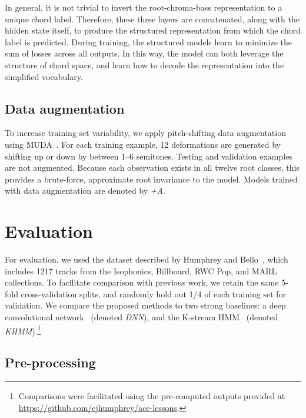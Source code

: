 \documentclass{article}
\begin{document}
In general, it is not trivial to invert the root-chroma-bass representation to a unique chord label.
Therefore, these three layers are concatenated, along with the hidden state itself, to produce the structured representation from which the chord label is predicted.
During training, the structured models learn to minimize the sum of losses across all outputs.
In this way, the model can both leverage the structure of chord space, and learn how to decode the representation into the simplified vocabulary.

\subsection{Data augmentation}
\label{sec:muda}
To increase training set variability, we apply pitch-shifting data augmentation using MUDA~\cite{mcfee2015software}.
For each training example, 12 deformations are generated by shifting up or down by between 1--6 semitones.
Testing and validation examples are not augmented.
Because each observation exists in all twelve root classes, this provides a brute-force, approximate root invariance to the model.
Models trained with data augmentation are denoted by \emph{+A}.


\section{Evaluation}

For evaluation, we used the dataset described by Humphrey and Bello~\cite{humphrey2015four}, which includes 1217 tracks from the Isophonics, Billboard, RWC Pop, and MARL collections.
To facilitate comparison with previous work, we retain the same 5-fold cross-validation splits, and randomly hold out 1/4 of each training set for validation.
We compare the proposed methods to two strong baselines: a deep convolutional network~\cite{humphrey2015four} (denoted \emph{DNN}), and the K-stream HMM~\cite{cho2014improved} (denoted \emph{KHMM}).\footnote{Comparisons were facilitated using the pre-computed outputs provided at \url{https://github.com/ejhumphrey/ace-lessons}.}

\subsection{Pre-processing}
\end{document}
